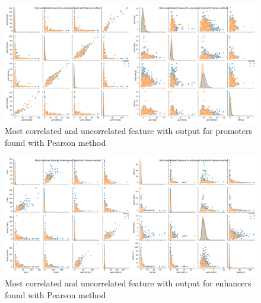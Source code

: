 \begin{figure}[h]
\centering
\includegraphics[width=0.98\linewidth]{../images/plot_pearson_promoters_correlated_uncorrelated.png}
\caption{Most correlated and uncorrelated feature with output for promoters found with Pearson method}
\end{figure}
\newpage
\begin{figure}[h]
\centering
\includegraphics[width=0.98\linewidth]{../images/plot_pearson_enhancers_correlated_uncorrelated.png}
\caption{Most correlated and uncorrelated feature with output for enhancers found with Pearson method}
\end{figure}

